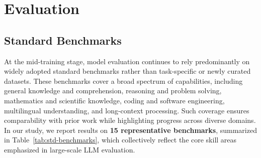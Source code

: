 \section{Evaluation}
\label{sec:evaluation}

\subsection{Standard Benchmarks}
\label{subsec:standard-benchmarks}
At the mid-training stage, model evaluation continues to rely predominantly on widely adopted standard benchmarks rather than task-specific or newly curated datasets. These benchmarks cover a broad spectrum of capabilities, including general knowledge and comprehension, reasoning and problem solving, mathematics and scientific knowledge, coding and software engineering, multilingual understanding, and long-context processing. Such coverage ensures comparability with prior work while highlighting progress across diverse domains. In our study, we report results on \textbf{15 representative benchmarks}, summarized in Table~\ref{tab:std-benchmarks}, which collectively reflect the core skill areas emphasized in large-scale LLM evaluation.

